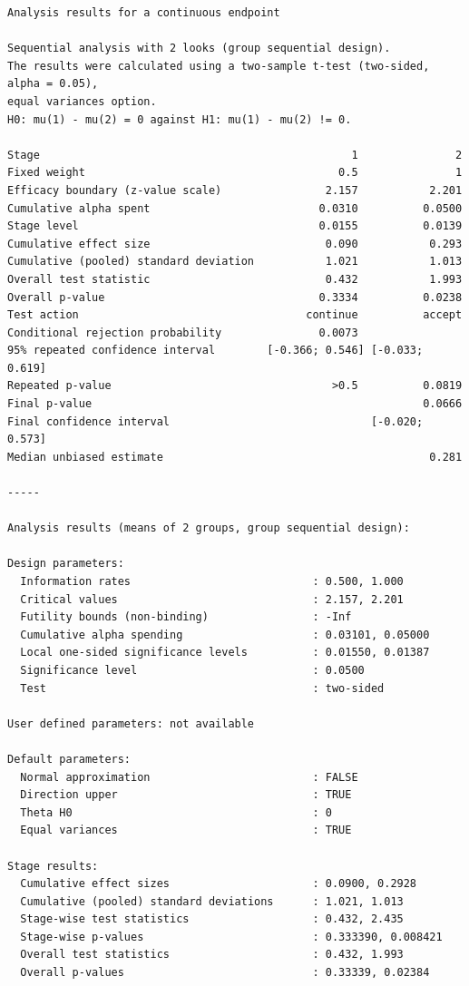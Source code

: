 \documentclass[
  letterpaper,
  DIV=11,
  numbers=noendperiod]{scrreprt}
\begin{document}
\begin{verbatim}
Analysis results for a continuous endpoint

Sequential analysis with 2 looks (group sequential design).
The results were calculated using a two-sample t-test (two-sided, alpha = 0.05), 
equal variances option.
H0: mu(1) - mu(2) = 0 against H1: mu(1) - mu(2) != 0.

Stage                                                1               2 
Fixed weight                                       0.5               1 
Efficacy boundary (z-value scale)                2.157           2.201 
Cumulative alpha spent                          0.0310          0.0500 
Stage level                                     0.0155          0.0139 
Cumulative effect size                           0.090           0.293 
Cumulative (pooled) standard deviation           1.021           1.013 
Overall test statistic                           0.432           1.993 
Overall p-value                                 0.3334          0.0238 
Test action                                   continue          accept 
Conditional rejection probability               0.0073                 
95% repeated confidence interval        [-0.366; 0.546] [-0.033; 0.619]
Repeated p-value                                  >0.5          0.0819 
Final p-value                                                   0.0666 
Final confidence interval                               [-0.020; 0.573]
Median unbiased estimate                                         0.281 

-----

Analysis results (means of 2 groups, group sequential design):

Design parameters:
  Information rates                            : 0.500, 1.000 
  Critical values                              : 2.157, 2.201 
  Futility bounds (non-binding)                : -Inf 
  Cumulative alpha spending                    : 0.03101, 0.05000 
  Local one-sided significance levels          : 0.01550, 0.01387 
  Significance level                           : 0.0500 
  Test                                         : two-sided 

User defined parameters: not available

Default parameters:
  Normal approximation                         : FALSE 
  Direction upper                              : TRUE 
  Theta H0                                     : 0 
  Equal variances                              : TRUE 

Stage results:
  Cumulative effect sizes                      : 0.0900, 0.2928 
  Cumulative (pooled) standard deviations      : 1.021, 1.013 
  Stage-wise test statistics                   : 0.432, 2.435 
  Stage-wise p-values                          : 0.333390, 0.008421 
  Overall test statistics                      : 0.432, 1.993 
  Overall p-values                             : 0.33339, 0.02384 


\end{verbatim}
\end{document}
